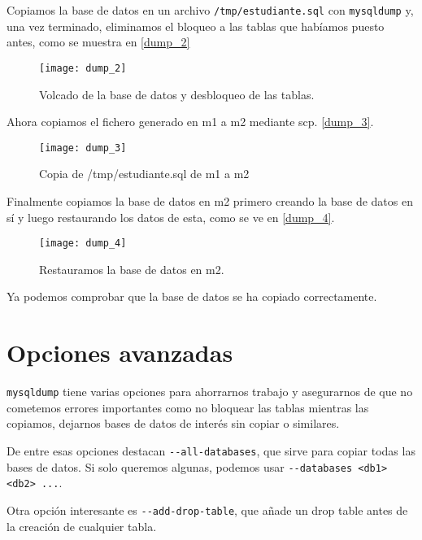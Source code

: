 Copiamos la base de datos en un archivo \verb|/tmp/estudiante.sql| con \verb|mysqldump| y, una vez terminado, eliminamos el bloqueo a las tablas que habíamos puesto antes, como se muestra en \eqref{dump_2}

\begin{figure}[h!]
\begin{center}
\caption{Volcado de la base de datos y desbloqueo de las tablas.}
\label{dump_2}
\texttt{[image: dump\_2]}
\end{center}
\end{figure}

Ahora copiamos el fichero generado en m1 a m2 mediante scp. \eqref{dump_3}.

\begin{figure}[h!]
\begin{center}
\caption{Copia de /tmp/estudiante.sql de m1 a m2}
\label{dump_3}
\texttt{[image: dump\_3]}
\end{center}
\end{figure}

Finalmente copiamos la base de datos en m2 primero creando la base de datos en sí y luego restaurando los datos de esta, como se ve en \eqref{dump_4}.

\begin{figure}[h!]
\begin{center}
\caption{Restauramos la base de datos en m2.}
\label{dump_4}
\texttt{[image: dump\_4]}
\end{center}
\end{figure}

Ya podemos comprobar que la base de datos se ha copiado correctamente.


\section{Opciones avanzadas}

\verb|mysqldump| tiene varias opciones para ahorrarnos trabajo y asegurarnos de que no cometemos errores importantes como no bloquear las tablas mientras las copiamos, dejarnos bases de datos de interés sin copiar o similares.

De entre esas opciones destacan \verb|--all-databases|, que sirve para copiar todas las bases de datos. Si solo queremos algunas, podemos usar \verb|--databases <db1> <db2> ...|. 

Otra opción interesante es \verb|--add-drop-table|, que añade un drop table antes de la creación de cualquier tabla.

